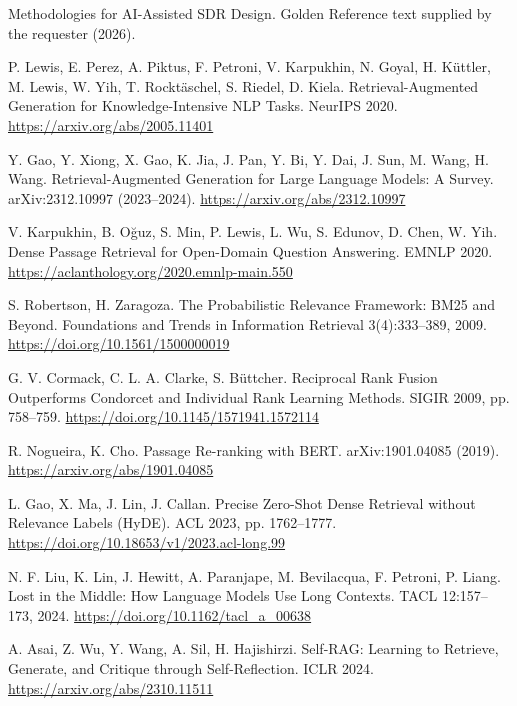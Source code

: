 \documentclass[11pt,a4paper]{article}
\begin{document}
\begin{description}[leftmargin=3.2em,labelwidth=2.8em,labelsep=0.4em,font=\normalfont,itemsep=3pt]
\small
\item[{[GR]}] \hypertarget{refGR}{}Methodologies for AI-Assisted SDR Design. Golden Reference text supplied by the requester (2026).
\item[{[1]}] \hypertarget{ref1}{}P. Lewis, E. Perez, A. Piktus, F. Petroni, V. Karpukhin, N. Goyal, H. K\"uttler, M. Lewis, W. Yih, T. Rockt\"aschel, S. Riedel, D. Kiela. Retrieval-Augmented Generation for Knowledge-Intensive NLP Tasks. NeurIPS 2020. \url{https://arxiv.org/abs/2005.11401}
\item[{[2]}] \hypertarget{ref2}{}Y. Gao, Y. Xiong, X. Gao, K. Jia, J. Pan, Y. Bi, Y. Dai, J. Sun, M. Wang, H. Wang. Retrieval-Augmented Generation for Large Language Models: A Survey. arXiv:2312.10997 (2023--2024). \url{https://arxiv.org/abs/2312.10997}
\item[{[3]}] \hypertarget{ref3}{}V. Karpukhin, B. O\u{g}uz, S. Min, P. Lewis, L. Wu, S. Edunov, D. Chen, W. Yih. Dense Passage Retrieval for Open-Domain Question Answering. EMNLP 2020. \url{https://aclanthology.org/2020.emnlp-main.550}
\item[{[4]}] \hypertarget{ref4}{}S. Robertson, H. Zaragoza. The Probabilistic Relevance Framework: BM25 and Beyond. Foundations and Trends in Information Retrieval 3(4):333--389, 2009. \url{https://doi.org/10.1561/1500000019}
\item[{[5]}] \hypertarget{ref5}{}G. V. Cormack, C. L. A. Clarke, S. B\"uttcher. Reciprocal Rank Fusion Outperforms Condorcet and Individual Rank Learning Methods. SIGIR 2009, pp. 758--759. \url{https://doi.org/10.1145/1571941.1572114}
\item[{[6]}] \hypertarget{ref6}{}R. Nogueira, K. Cho. Passage Re-ranking with BERT. arXiv:1901.04085 (2019). \url{https://arxiv.org/abs/1901.04085}
\item[{[7]}] \hypertarget{ref7}{}L. Gao, X. Ma, J. Lin, J. Callan. Precise Zero-Shot Dense Retrieval without Relevance Labels (HyDE). ACL 2023, pp. 1762--1777. \url{https://doi.org/10.18653/v1/2023.acl-long.99}
\item[{[8]}] \hypertarget{ref8}{}N. F. Liu, K. Lin, J. Hewitt, A. Paranjape, M. Bevilacqua, F. Petroni, P. Liang. Lost in the Middle: How Language Models Use Long Contexts. TACL 12:157--173, 2024. \url{https://doi.org/10.1162/tacl_a_00638}
\item[{[9]}] \hypertarget{ref9}{}A. Asai, Z. Wu, Y. Wang, A. Sil, H. Hajishirzi. Self-RAG: Learning to Retrieve, Generate, and Critique through Self-Reflection. ICLR 2024. \url{https://arxiv.org/abs/2310.11511}

\end{description}
\end{document}
